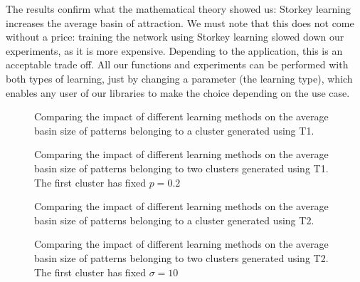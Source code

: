 The results confirm what the mathematical theory showed us: Storkey learning
increases the average basin of attraction. We must note that this does not
come without a price: training the network using Storkey learning slowed down
our experiments, as it is more expensive. Depending to the application, this
is an acceptable trade off. All our functions and experiments can be performed
with both types of learning, just by changing a parameter (the learning type),
which enables any user of our libraries to make the choice depending on the
use case.


\begin{figure}[h]
  \centering
  
\caption{Comparing the impact of different learning methods on the average basin size of patterns belonging to a cluster generated using T1.}
\label{fig:plot-storkey-T1-onecluster}
\end{figure}

\begin{figure}[h]
  \centering
  
\caption{Comparing the impact of different learning methods on the average basin size of patterns belonging to two clusters generated using T1. The first cluster has fixed $p = 0.2$}
\label{fig:plot-storkey-T1-twoclusters}
\end{figure}



\begin{figure}[h]
  \centering
  
\caption{Comparing the impact of different learning methods on the average basin size of patterns belonging to a cluster generated using T2.}
\label{fig:plot-storkey-T2-onecluster}
\end{figure}

\begin{figure}[h]
  \centering
  
\caption{Comparing the impact of different learning methods on the average basin size of patterns belonging to two clusters generated using T2. The first cluster has fixed $\sigma = 10$}
\label{fig:plot-storkey-T2-twoclusters}
\end{figure}
